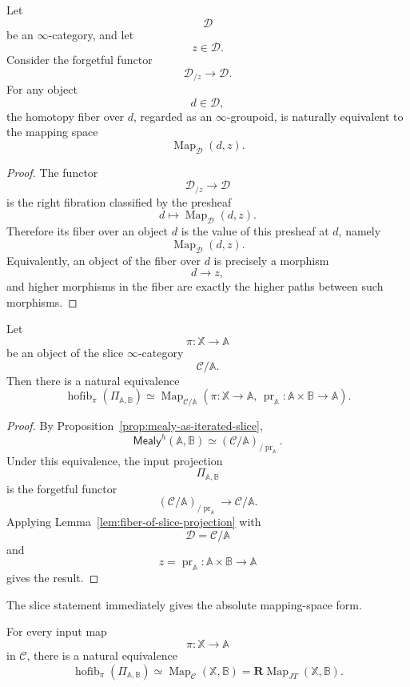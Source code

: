 \begin{lemma}
\label{lem:fiber-of-slice-projection}
Let
\[
\mathcal D
\]
be an \(\infty\)-category, and let
\[
z\in\mathcal D.
\]
Consider the forgetful functor
\[
\mathcal D_{/z}\to\mathcal D.
\]
For any object
\[
d\in\mathcal D,
\]
the homotopy fiber over \(d\), regarded as an \(\infty\)-groupoid, is
naturally equivalent to the mapping space
\[
\operatorname{Map}_{\mathcal D}(d,z).
\]
\end{lemma}

\begin{proof}
The functor
\[
\mathcal D_{/z}\to\mathcal D
\]
is the right fibration classified by the presheaf
\[
d\longmapsto \operatorname{Map}_{\mathcal D}(d,z).
\]
Therefore its fiber over an object \(d\) is the value of this presheaf at
\(d\), namely
\[
\operatorname{Map}_{\mathcal D}(d,z).
\]
Equivalently, an object of the fiber over \(d\) is precisely a morphism
\[
d\to z,
\]
and higher morphisms in the fiber are exactly the higher paths between
such morphisms.
\end{proof}

\begin{theorem}
\label{thm:fiber-theorem-slice-form-rewritten}
Let
\[
\pi:\mathbb X\to\mathbb A
\]
be an object of the slice \(\infty\)-category
\[
\mathcal C/\mathbb A.
\]
Then there is a natural equivalence
\[
\operatorname{hofib}_{\pi}
\left(
\Pi_{\mathbb A,\mathbb B}
\right)
\simeq
\operatorname{Map}_{\mathcal C/\mathbb A}
\left(
\pi:\mathbb X\to\mathbb A,\,
\operatorname{pr}_{\mathbb A}:\mathbb A\times\mathbb B\to\mathbb A
\right).
\]
\end{theorem}

\begin{proof}
By Proposition~\ref{prop:mealy-as-iterated-slice},
\[
\mathsf{Mealy}^h(\mathbb A,\mathbb B)
\simeq
(\mathcal C/\mathbb A)_{/\operatorname{pr}_{\mathbb A}}.
\]
Under this equivalence, the input projection
\[
\Pi_{\mathbb A,\mathbb B}
\]
is the forgetful functor
\[
(\mathcal C/\mathbb A)_{/\operatorname{pr}_{\mathbb A}}
\longrightarrow
\mathcal C/\mathbb A.
\]
Applying Lemma~\ref{lem:fiber-of-slice-projection} with
\[
\mathcal D=\mathcal C/\mathbb A
\]
and
\[
z=\operatorname{pr}_{\mathbb A}:\mathbb A\times\mathbb B\to\mathbb A
\]
gives the result.
\end{proof}

The slice statement immediately gives the absolute mapping-space form.

\begin{corollary}
\label{cor:fiber-theorem-absolute-form-rewritten}
For every input map
\[
\pi:\mathbb X\to\mathbb A
\]
in \(\mathcal C\), there is a natural equivalence
\[
\operatorname{hofib}_{\pi}
\left(
\Pi_{\mathbb A,\mathbb B}
\right)
\simeq
\operatorname{Map}_{\mathcal C}(\mathbb X,\mathbb B)
=
\mathbf R\!\operatorname{Map}_{JT}(\mathbb X,\mathbb B).
\]
\end{corollary}

